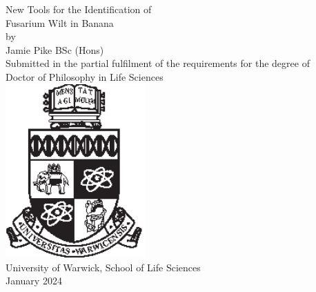 \begin{titlepage}
    \begin{center}
        \singlespacing
        \Huge
        New Tools for the Identification of \\\vspace*{0.5cm} Fusarium Wilt in Banana \\
        \vspace*{1.75cm}
        \normalsize
        by \\ 
        \vspace*{0.2cm}
        \LARGE
        Jamie Pike BSc (Hons) \\ 
        \large
        \vfill
        \normalsize
        Submitted in the partial fulfilment of the requirements for the degree of \\
        \Large
        \vspace*{0.3cm}
        Doctor of Philosophy in Life Sciences \\
        \vspace*{1cm}
        \includegraphics[width=0.4\textwidth]{Preamble/crest_black.eps} \\
        \vspace*{1cm}
        \large
        University of Warwick, School of Life Sciences\\
        \vspace*{0.5cm}
        \normalsize
        January 2024 \\
         \vspace*{1cm}   
    \end{center}
    \clearpage
\end{titlepage}